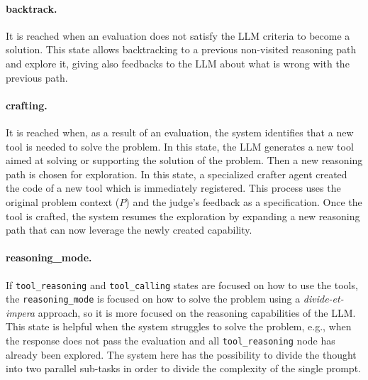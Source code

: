 \documentclass[12pt,a4paper,openright,twoside]{book}
\begin{document}
\paragraph{backtrack.} It is reached when an evaluation does not satisfy the \ac{LLM} criteria to become a solution. This state allows backtracking to a previous non-visited reasoning path and explore it, giving also feedbacks to the LLM about what is wrong with the previous path.

\paragraph{crafting.} It is reached when, as a result of an evaluation, the system identifies that a new tool is needed to solve the problem. In this state, the \ac{LLM} generates a new tool aimed at solving or supporting the solution of the problem.
%
Then a new reasoning path is chosen for exploration. In this state, a specialized crafter agent created the code of a new tool which is immediately registered. This process uses the original problem context ($P$) and the judge's feedback as a specification. Once the tool is crafted, the system resumes the exploration by expanding a new reasoning path that can now leverage the newly created capability.

\paragraph{reasoning\_mode.} If \texttt{tool\_reasoning} and \texttt{tool\_calling} states are focused on how to use the tools, the \texttt{reasoning\_mode} is focused on how to solve the problem using a \textit{divide-et-impera} approach, so it is more focused on the reasoning capabilities of the \ac{LLM}. This state is helpful when the system struggles to solve the problem, e.g., when the response does not pass the evaluation and all \texttt{tool\_reasoning} node has already been explored. The system here has the possibility to divide the thought into two parallel sub-tasks in order to divide the complexity of the single prompt.
\end{document}
